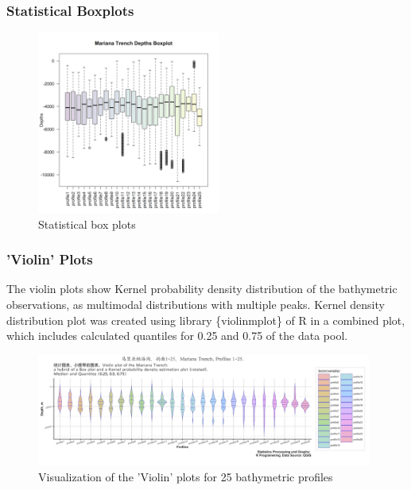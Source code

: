 \documentclass[pdflatex,compress,10pt,
	xcolor={dvipsnames,dvipsnames,svgnames,x11names,table},
	hyperref={colorlinks = true,breaklinks = true, urlcolor = NavyBlue, breaklinks = true}]{beamer}
\begin{document}
\begin{frame}\frametitle{Statistical Boxplots}
\begin{figure}[H]
	\centering
		\includegraphics[width=6cm]{Fig-2-6.jpg}
	\caption{Statistical box plots}
\end{figure}		
\end{frame}

\begin{frame}\frametitle{'Violin' Plots}
The violin plots show Kernel probability density distribution of the bathymetric observations, as multimodal distributions with multiple peaks. Kernel density distribution plot was created using library \{violinmplot\} of R in a combined plot, which includes calculated quantiles for 0.25 and 0.75 of the data pool. 
\begin{figure}[H]
	\centering
		\includegraphics[width=11cm]{Fig-2-7.jpg}\caption{Visualization of the 'Violin' plots for 25 bathymetric profiles}
\end{figure}		
\end{frame}
\end{document}
